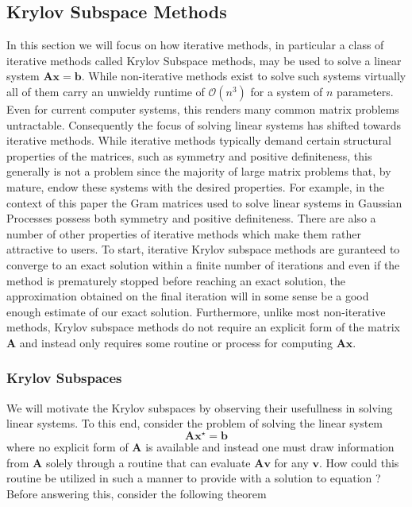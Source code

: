 \subsection{Krylov Subspace Methods}\label{Section1.1}

In this section we will focus on how iterative methods, in particular a class of iterative methods called Krylov Subspace methods, may be used to solve a linear system $\bm{A} \bm{x} = \bm{b}$. While non-iterative methods exist to solve such systems virtually all of them carry an unwieldy runtime of $\mathcal{O} \left( n^3 \right)$ for a system of $n$ parameters. Even for current computer systems, this renders many common matrix problems untractable. Consequently the focus of solving linear systems has shifted towards iterative methods. While iterative methods typically demand certain structural properties of the matrices, such as symmetry and positive definiteness, this generally is not a problem since the majority of large matrix problems that, by mature, endow these systems with the desired properties. For example, in the context of this paper the Gram matrices used to solve linear systems in Gaussian Processes possess both symmetry and positive definiteness. There are also a number of other properties of iterative methods which make them rather attractive to users. To start, iterative Krylov subspace methods are guranteed to converge to an exact solution within a finite number of iterations and even if the method is prematurely stopped before reaching an exact solution, the approximation obtained on the final iteration will in some sense be a good enough estimate of our exact solution. Furthermore, unlike most non-iterative methods, Krylov subspace methods do not require an explicit form of the matrix $\bm{A}$ and instead only requires some routine or process for computing $\bm{A} \bm{x}$.

\subsubsection{Krylov Subspaces}\label{Section1.1.1}

We will motivate the Krylov subspaces by observing their usefullness in solving linear systems. To this end, consider the problem of solving the linear system
\begin{equation}\label{eq: lin_sys_1}
    \bm{A} \bm{x^{\star}} = \bm{b}
\end{equation}
where no explicit form of $\bm{A}$ is available and instead one must draw information from $\bm{A}$ solely through a routine that can evaluate $\bm{A} \bm{v}$ for any $\bm{v}$. How could this routine be utilized in such a manner to provide with a solution to equation  ? Before answering this, consider the following theorem

